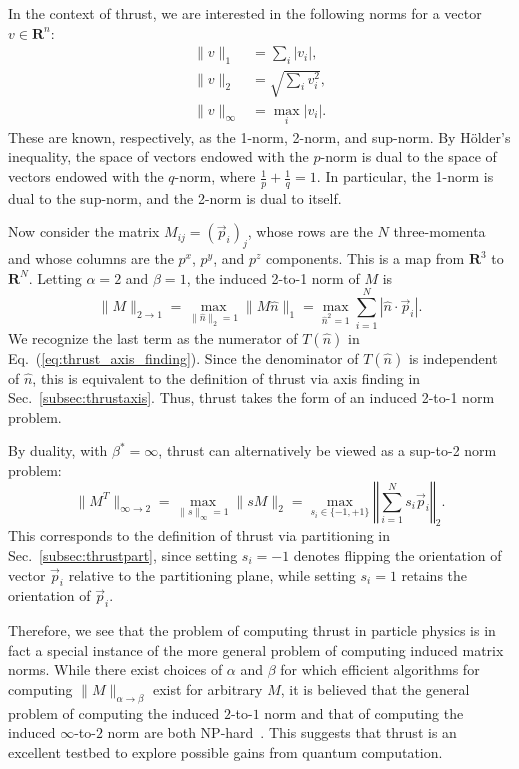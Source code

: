 \documentclass[aps,prd,twocolumn,superscriptaddress,preprintnumbers,nofootinbib,longbibliography,floatfix]{revtex4-1}
\DeclareRobustCommand{\Sec}[1]{Sec.~\ref{#1}}
\DeclareRobustCommand{\Eq}[1]{Eq.~(\ref{#1})}
\begin{document}
In the context of thrust, we are interested in the following norms for a vector $v\in\mathbf{R}^n$:
%
\begin{align}
\|v\|_1 &=\sum_{i}|v_i|,\\
\|v\|_2 &=\sqrt{\sum_iv_i^2},\\
\|v\|_\infty & =\max_i|v_i|.
\end{align}
%
These are known, respectively, as the 1-norm, 2-norm, and sup-norm. 
%
By H\"older's inequality, the space of vectors endowed with the $p$-norm is dual to the space of vectors endowed with the $q$-norm, where $\frac{1}{p} + \frac{1}{q}=1$.
%
In particular, the 1-norm is dual to the sup-norm, and the 2-norm is dual to itself.


Now consider the matrix $M_{ij}=(\vec{p}_i)_j$, whose rows are the $N$ three-momenta and whose columns are the $p^x$, $p^y$, and $p^z$ components.
%
This is a map from $\mathbf{R}^3$ to $\mathbf{R}^N$.
%
Letting $\alpha=2$ and $\beta=1$, the induced 2-to-1 norm of $M$ is
%
\begin{equation}
\|M\|_{2\rightarrow 1} = \max_{\|\hat{n}\|_2=1}\|M\hat{n}\|_1=\max_{\hat{n}^2=1}\sum_{i=1}^N|\hat{n} \cdot \vec{p}_i|.
\end{equation}
%
We recognize the last term as the numerator of $T(\hat{n})$ in \Eq{eq:thrust_axis_finding}.
%
Since the denominator of $T(\hat{n})$ is independent of $\hat{n}$, this is equivalent to the definition of thrust via axis finding in \Sec{subsec:thrustaxis}.
%
Thus, thrust takes the form of an induced 2-to-1 norm problem.


By duality, with $\beta^*=\infty$, thrust can alternatively be viewed as a sup-to-2 norm problem:
%
\begin{equation}
\|M^T\|_{\infty\rightarrow 2} = \max_{\|s\|_\infty=1}\|sM\|_2=\max_{s_i\in\{-1, +1\}}\left\Vert\sum_{i=1}^N s_i\vec{p}_i\right\Vert_2.
\end{equation}
%
This corresponds to the definition of thrust via partitioning in \Sec{subsec:thrustpart}, since setting $s_i=-1$ denotes flipping the orientation of vector $\vec{p}_i$ relative to the partitioning plane, while setting $s_i=1$ retains the orientation of $\vec{p}_i$.

Therefore, we see that the problem of computing thrust in particle physics is in fact a special instance of the more general problem of computing induced matrix norms.
%
While there exist choices of $\alpha$ and $\beta$ for which efficient algorithms for computing $\|M\|_{\alpha\rightarrow\beta}$ exist for arbitrary $M$, it is believed that the general problem of computing the induced $2$-to-$1$ norm and that of computing the induced $\infty$-to-$2$ norm are both NP-hard~\cite{Ste05, 2010arXiv1001.2613B, 2009arXiv0908.1397H}.
%
This suggests that thrust is an excellent testbed to explore possible gains from quantum computation.
\end{document}
